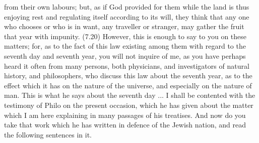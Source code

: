 from their own labours; but, as if God provided for them while the land is thus enjoying rest and
regulating itself according to its will, they think that any one who chooses or who is in want, any
traveller or stranger, may gather the fruit that year with impunity. (7.20) However, this is enough to say
to you on these matters; for, as to the fact of this law existing among them with regard to the seventh
day and seventh year, you will not inquire of me, as you have perhaps heard it often from many persons,
both physicians, and investigators of natural history, and philosophers, who discuss this law about the
seventh year, as to the effect which it has on the nature of the universe, and especially on the nature of
man. This is what he says about the seventh day ... I shall be contented with the testimony of Philo on
the present occasion, which he has given about the matter which I am here explaining in many passages
of his treatises. And now do you take that work which he has written in defence of the Jewish nation, and
read the following sentences in it.


